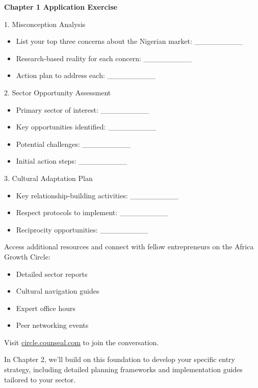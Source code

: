 \begin{workshopbox}
\textbf{Chapter 1 Application Exercise}

1. Misconception Analysis
\begin{itemize}
    \item List your top three concerns about the Nigerian market: \_\_\_\_\_\_\_\_\_
    \item Research-based reality for each concern: \_\_\_\_\_\_\_\_\_
    \item Action plan to address each: \_\_\_\_\_\_\_\_\_
\end{itemize}

2. Sector Opportunity Assessment
\begin{itemize}
    \item Primary sector of interest: \_\_\_\_\_\_\_\_\_
    \item Key opportunities identified: \_\_\_\_\_\_\_\_\_
    \item Potential challenges: \_\_\_\_\_\_\_\_\_
    \item Initial action steps: \_\_\_\_\_\_\_\_\_
\end{itemize}

3. Cultural Adaptation Plan
\begin{itemize}
    \item Key relationship-building activities: \_\_\_\_\_\_\_\_\_
    \item Respect protocols to implement: \_\_\_\_\_\_\_\_\_
    \item Reciprocity opportunities: \_\_\_\_\_\_\_\_\_
\end{itemize}
\end{workshopbox}

\begin{communitybox}
Access additional resources and connect with fellow entrepreneurs on the Africa Growth Circle:
\begin{itemize}
    \item Detailed sector reports
    \item Cultural navigation guides
    \item Expert office hours
    \item Peer networking events
\end{itemize}
Visit \href{https://viz.li/csl-book-circle}{circle.counseal.com} to join the conversation.
\end{communitybox}

\begin{importantbox}
In Chapter 2, we'll build on this foundation to develop your specific entry strategy, including detailed planning frameworks and implementation guides tailored to your sector.
\end{importantbox}